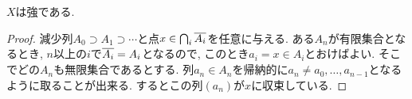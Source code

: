\documentclass[uplatex, dvipdfmx, a4paper, 12pt, class=jsbook, crop=false]{standalone}
\begin{document}
\begin{property}
	$ X $は強\Frechet である.
\end{property}
\begin{proof}
	減少列$ A_0 \supset A_1 \supset \cdots $と点$ x \in \bigcap_i \overline{A_i} $を任意に与える. ある$ A_n $が有限集合となるとき, $ n $以上の$ i $で$ \overline{A_i} = A_i $となるので, このとき$ a_i = x \in A_i $とおけばよい. そこでどの$ A_n $も無限集合であるとする. 列$ a_n \in A_n $を帰納的に$ a_n \neq a_0, \ldots, a_{n-1} $となるように取ることが出来る. するとこの列$ (a_n) $が$ x $に収束している.
\end{proof}
\end{document}
